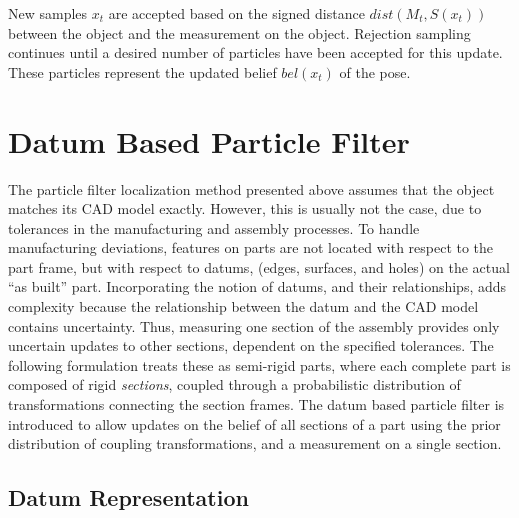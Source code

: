 \documentclass[../thesis.tex]{subfiles}
\begin{document}
New samples $x_t$ are accepted based on the signed distance $dist(M_t,S(x_t))$ between the object and the measurement on the object. Rejection sampling continues until a desired number of particles have been accepted for this update. 
These particles represent the updated belief $bel(x_t)$ of the pose. 


\section{Datum Based Particle Filter} \label{sec:datum}

The particle filter localization method presented above assumes that the object matches its CAD model exactly. 
However, this is usually not the case, due to tolerances in the manufacturing and assembly processes.
To handle manufacturing deviations, features on parts are not located with respect to the part frame, but with respect to datums, (edges, surfaces, and holes) on the actual ``as built'' part. Incorporating the notion of datums, and their relationships, adds complexity because the relationship between the datum and the CAD model contains uncertainty. Thus, measuring one section of the assembly provides only uncertain updates to other sections, dependent on the specified tolerances. 
The following formulation treats these as semi-rigid parts, where each complete part is composed of rigid \textit{sections}, coupled through a probabilistic distribution of transformations connecting the section frames.
The datum based particle filter is introduced to allow updates on the belief of all sections of a part using the prior distribution of coupling transformations, and a measurement on a single section.

\subsection{Datum Representation}
\end{document}
